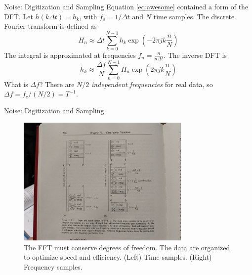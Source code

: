 \documentclass{beamer}
\begin{document}
\begin{frame}{Noise: Digitization and Sampling}
Equation \ref{eq:awesome} contained a form of the DFT.  Let $h(k\Delta t) = h_k$, with $f_s = 1/\Delta t$ and $N$ time samples. The discrete Fourier transform is defined as
\begin{equation}
H_n \approx \Delta t \sum_{k=0}^{N-1} h_k \exp\left( -2\pi j k \frac{n}{N} \right) \label{eq:fft1}
\end{equation}
The integral is approximated at frequencies $f_n = \frac{n}{n\Delta t}$. The inverse DFT is
\begin{equation}
h_k \approx \frac{\Delta f}{N}\sum_{n=0}^{N-1} H_n \exp\left( 2\pi j k \frac{n}{N} \right) \label{eq:fft2}
\end{equation}
What is $\Delta f$? There are $N/2$ \textit{independent frequencies} for real data, so $\Delta f = f_c/(N/2) = T^{-1}$.
\end{frame}

\begin{frame}{Noise: Digitization and Sampling}
\begin{figure}
\centering
\includegraphics[width=0.75\textwidth,trim=21cm 25cm 18cm 12cm,clip=true]{figures/fft.jpg}
\caption{\label{fig:fft3} The FFT must conserve degrees of freedom.  The data are organized to optimize speed and efficiency.  (Left) Time samples. (Right) Frequency samples.}
\end{figure}
\end{frame}
\end{document}
